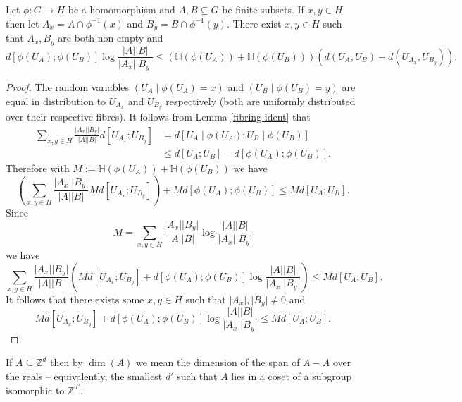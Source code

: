 \begin{lemma}\label{single-fibres}\leanok
Let $\phi:G\to H$ be a homomorphism and $A,B\subseteq G$ be finite subsets. If $x,y\in H$ then let $A_x=A\cap \phi^{-1}(x)$ and $B_y=B\cap \phi^{-1}(y)$. There exist $x,y\in H$ such that $A_x,B_y$ are both non-empty and
\[d[\phi(U_A);\phi(U_B)]\log \frac{\lvert A\rvert\lvert B\rvert}{\lvert A_x\rvert\lvert B_y\rvert}\leq (\mathbb{H}(\phi(U_A))+\mathbb{H}(\phi(U_B)))(d(U_A,U_B)-d(U_{A_x},U_{B_y})).\]
\end{lemma}
\begin{proof}
The random variables $(U_A\mid \phi(U_A)=x)$ and $(U_B\mid \phi(U_B)=y)$ are equal in distribution to $U_{A_x}$ and $U_{B_y}$ respectively (both are uniformly distributed over their respective fibres). It follows from Lemma \ref{fibring-ident} that
\begin{align*}
\sum_{x,y\in H}\frac{\lvert A_x\rvert\lvert B_y\rvert}{\lvert A\rvert\lvert B\rvert}d[U_{A_x};U_{B_y}]
&=d[U_A\mid \phi(U_A); U_B\mid \phi(U_B)]\\
&\leq d[U_A;U_B]-d[\phi(U_A);\phi(U_B)].
\end{align*}
Therefore with $M:=\mathbb{H}(\phi(U_A))+\mathbb{H}(\phi(U_B))$ we have
\[\left(\sum_{x,y\in H}\frac{\lvert A_x\rvert\lvert B_y\rvert}{\lvert A\rvert\lvert B\rvert}Md[U_{A_x};U_{B_y}]\right)+Md[\phi(U_A);\phi(U_B)]\leq Md[U_A;U_B].\]
Since
\[M=\sum_{x,y\in H}\frac{\lvert A_x\rvert\lvert B_y\rvert}{\lvert A\rvert\lvert B\rvert}\log \frac{\lvert A\rvert\lvert B\rvert}{\lvert A_x\rvert\lvert B_y\rvert}\]
we have
\[\sum_{x,y\in H} \frac{\lvert A_x\rvert\lvert B_y\rvert}{\lvert A\rvert\lvert B\rvert}\left(Md[U_{A_x};U_{B_y}]+d[\phi(U_A);\phi(U_B)]\log \frac{\lvert A\rvert\lvert B\rvert}{\lvert A_x\rvert\lvert B_y\rvert}\right)\leq  Md[U_A;U_B].\]
It follows that there exists some $x,y\in H$ such that $\lvert A_x\rvert,\lvert B_y\rvert\neq 0$ and
\[Md[U_{A_x};U_{B_y}]+d[\phi(U_A);\phi(U_B)]\log \frac{\lvert A\rvert\lvert B\rvert}{\lvert A_x\rvert\lvert B_y\rvert}\leq  Md[U_A;U_B].\]
\end{proof}


\begin{definition}\label{dimension-def}\leanok
If $A\subseteq \mathbb{Z}^{d}$ then by $\dim(A)$ we mean the dimension of the span of $A-A$ over the reals -- equivalently, the smallest $d'$ such that $A$ lies in a coset of a subgroup isomorphic to $\mathbb{Z}^{d'}$.
\end{definition}


